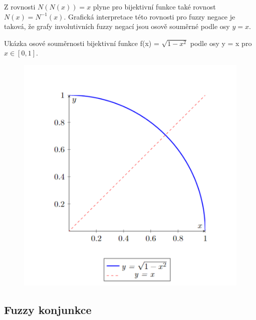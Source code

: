     \begin{remark}
        Z rovnosti $N(N(x))=x$ plyne pro bijektivn\'i funkce tak\'e rovnost $N(x)= N^{-1}(x).$ 
         Grafick\'a interpretace  t\'eto rovnosti  pro fuzzy negace je taková, že grafy involutivních fuzzy negací jsou osově souměrné podle osy $y = x$.
        \begin{graph} Ukázka osové souměrnosti bijektivní funkce f(x) = $\sqrt{1-x^2}$ podle osy y = x pro $x \in [0,1]$.\\
            
            \begin{figure}[h]
                \hspace{-1cm}
                \includegraphics[scale=0.65]{template-fig/soumernost.pdf}
                \centering
            \end{figure}
        \end{graph}
    \end{remark}


    
\subsection{Fuzzy konjunkce}

